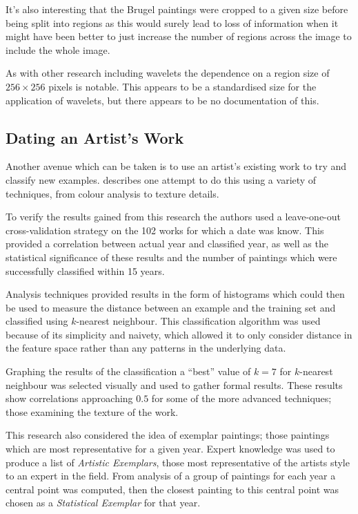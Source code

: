 \documentclass[conference]{IEEEtran}
\begin{document}
It's also interesting that the Brugel paintings were cropped to a given size
before being split into regions as this would surely lead to loss of
information when it might have been better to just increase the number of
regions across the image to include the whole image.

As with other research including wavelets the dependence on a region size of
$256 \times 256$ pixels is notable. This appears to be a standardised size for
the application of wavelets, but there appears to be no documentation of this.


\subsection{Dating an Artist's Work}

Another avenue which can be taken is to use an artist's existing work to try
and classify new examples. \cite{brown13can} describes one attempt to do this
using a variety of techniques, from colour analysis to texture details.

To verify the results gained from this research the authors used a
leave-one-out cross-validation strategy on the 102 works for which a date was
know. This provided a correlation between actual year and classified year, as
well as the statistical significance of these results and the number of
paintings which were successfully classified within 15 years.

Analysis techniques provided results in the form of histograms which could then
be used to measure the distance between an example and the training set and
classified using $k$-nearest neighbour. This classification algorithm was used
because of its simplicity and naivety, which allowed it to only consider
distance in the feature space rather than any patterns in the underlying data.

Graphing the results of the classification a ``best'' value of $k = 7$ for
$k$-nearest neighbour was selected visually and used to gather formal results.
These results show correlations approaching $0.5$ for some of the more advanced
techniques; those examining the texture of the work.

This research also considered the idea of exemplar paintings; those paintings
which are most representative for a given year. Expert knowledge was used to
produce a list of \emph{Artistic Exemplars}, those most representative of the
artists style to an expert in the field. From analysis of a group of paintings
for each year a central point was computed, then the closest painting to this
central point was chosen as a \emph{Statistical Exemplar} for that year.
\end{document}

